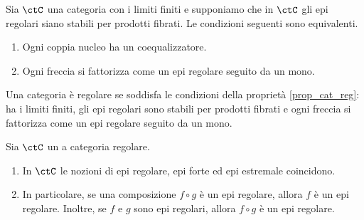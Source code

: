 \begin{proposition}\label{prop_cat_reg}
 Sia \(\ctC\) una categoria con i limiti finiti e supponiamo che in \(\ctC\) gli epi regolari siano stabili per prodotti fibrati.
 Le condizioni seguenti sono equivalenti.
 \begin{enumerate}
  \item Ogni coppia nucleo ha un coequalizzatore.
  \item Ogni freccia si fattorizza come un epi regolare seguito da un mono.
 \end{enumerate}
\end{proposition}

\begin{definition}\label{def_cat_reg}
 Una categoria è regolare se soddisfa le condizioni della proprietà \ref{prop_cat_reg}: ha i limiti finiti, gli epi regolari
 sono stabili per prodotti fibrati e ogni freccia si fattorizza come un epi regolare seguito da un mono.
\end{definition}

\begin{proposition}\label{prop_epi_reg_cat_reg}
 Sia \(\ctC\) un a categoria regolare.
 \begin{enumerate}
  \item In \(\ctC\) le nozioni di epi regolare, epi forte ed epi estremale coincidono.
  \item In particolare, se una composizione \(f \circ g\) è un epi regolare, allora \(f\) è un epi regolare.
        Inoltre, se \(f\) e \(g\) sono epi regolari, allora \(f \circ g\) è un epi regolare.
 \end{enumerate}
\end{proposition}

